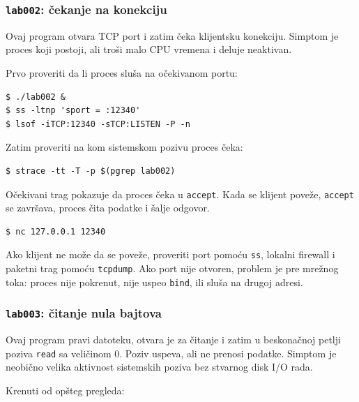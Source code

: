 \subsubsection{\texorpdfstring{\texttt{lab002}: čekanje na konekciju}{lab002: čekanje na konekciju}}\label{lab002-cekanje-na-konekciju}

Ovaj program otvara TCP port i zatim čeka klijentsku konekciju. Simptom je proces koji postoji, ali troši malo CPU vremena i deluje neaktivan.


Prvo proveriti da li proces sluša na očekivanom portu:

\begin{verbatim}
$ ./lab002 &
$ ss -ltnp 'sport = :12340'
$ lsof -iTCP:12340 -sTCP:LISTEN -P -n
\end{verbatim}

Zatim proveriti na kom sistemskom pozivu proces čeka:

\begin{verbatim}
$ strace -tt -T -p $(pgrep lab002)
\end{verbatim}

Očekivani trag pokazuje da proces čeka u \texttt{accept}. Kada se klijent poveže, \texttt{accept} se završava, proces čita podatke i šalje odgovor.

\begin{verbatim}
$ nc 127.0.0.1 12340
\end{verbatim}

Ako klijent ne može da se poveže, proveriti port pomoću \texttt{ss}, lokalni firewall i paketni trag pomoću \texttt{tcpdump}. Ako port nije otvoren, problem je pre mrežnog toka: proces nije pokrenut, nije uspeo \texttt{bind}, ili sluša na drugoj adresi.

\subsubsection{\texorpdfstring{\texttt{lab003}: čitanje nula bajtova}{lab003: čitanje nula bajtova}}\label{lab003-citanje-nula-bajtova}

Ovaj program pravi datoteku, otvara je za čitanje i zatim u beskonačnoj petlji poziva \texttt{read} sa veličinom 0. Poziv uspeva, ali ne prenosi podatke. Simptom je neobično velika aktivnost sistemskih poziva bez stvarnog disk I/O rada.


Krenuti od opšteg pregleda:

